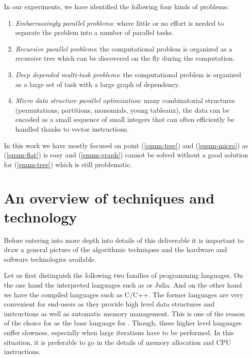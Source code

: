 \documentclass{deliverablereport}
\begin{document}
In our experiments, we have identified the following four kinds of problems:
\begin{enumerate}
\item\label{enum-flat} \emph{Embarrassingly parallel problems}: where
  little or no effort is needed to separate the problem into a number of
  parallel tasks.
\item\label{enum-tree} \emph{Recursive parallel problems}: the computational
  problem is organized as a recursive tree which can be discovered on the fly
  during the computation.
\item\label{enum-graph} \emph{Deep depended multi-task problems}: the
  computational problem is organized as a large set of task with a large graph
  of dependency.
\item\label{enum-micro} \emph{Micro data structure parallel optimization}:
  many combinatorial structures (permutations, partitions, monomials, young
  tableaux), the data can be encoded as a small sequence of small integers
  that can often efficiently be handled thanks to vector instructions.
\end{enumerate}
In this work we have mostly focused on point (\ref{enum-tree}) and
(\ref{enum-micro}) as (\ref{enum-flat}) is easy and (\ref{enum-graph}) cannot
be solved without a good solution for (\ref{enum-tree}) which is still
problematic.


\section{An overview of techniques and technology}

Before entering into more depth into details of this deliverable it is
important to draw a general picture of the algorithmic techniques
and the hardware and software technologies available.

Let us first distinguish the following two families of programming
languages. On the one hand the interpreted languages
such as \Python or Julia. And on the other hand we have the compiled languages
such as C/C++. The former languages are very convenient for end-users as
they provide high level data structures and instructions as well as automatic
memory management. This is one of the reason of the choice for \Python as the
base language for \Sage. Though, these higher level languages suffer slowness,
especially when large iterations have to be performed. In this situation, it is
preferable to go in the details of memory allocation and CPU instructions.
\end{document}
